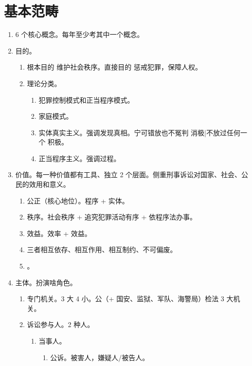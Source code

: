 \section{基本范畴}
\begin{enumerate}
  \item 6 个核心概念。每年至少考其中一个概念。
  \item 目的。
        \begin{enumerate}
          \item 根本目的 \yjt 维护社会秩序。直接目的 \yjt 惩戒犯罪，保障人权。
          \item 理论分类。
                \begin{enumerate}
                  \item 犯罪控制模式和正当程序模式。
                  \item 家庭模式。
                  \item 实体真实主义。强调发现真相。宁可错放也不冤判 \yjt 消极|不放过任何一个 \yjt 积极。
                  \item 正当程序主义。强调过程。
                \end{enumerate}
        \end{enumerate}
  \item 价值。每一种价值都有工具、独立 2 个层面。侧重刑事诉讼对国家、社会、公民的效用和意义。
        \begin{enumerate}
          \item 公正（核心地位）。程序 + 实体。
          \item 秩序。社会秩序 + 追究犯罪活动有序 + 依程序法办事。
          \item 效益。效率 + 效益。
          \item 三者相互依存、相互作用、相互制约、不可偏废。
          \item {}。
        \end{enumerate}
  \item 主体。扮演啥角色。
        \begin{enumerate}
          \item 专门机关。3 大 4 小。公（+ 国安、监狱、军队、海警局）检法 3 大机关。
          \item 诉讼参与人。2 种人。
                \begin{enumerate}
                  \item 当事人。
                        \begin{enumerate}
                          \item 公诉。被害人，嫌疑人/被告人。

\end{enumerate}
\end{enumerate}
\end{enumerate}
\end{enumerate}
